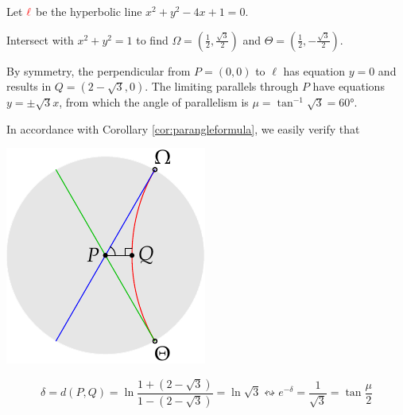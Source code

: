 \begin{examples}{}{}
\exstart Let $\textcolor{red}{\ell}$ be the hyperbolic line $x^2+y^2-4x+1=0$.\par
\begin{enumerate}\setcounter{enumi}{1}
\begin{minipage}[t]{0.7\linewidth}\vspace{-5pt}
  \item[]Intersect with $x^2+y^2=1$ to find $\Omega=\left(\tfrac 12,\tfrac{\sqrt 3}2\right)$ and $\Theta=\left(\tfrac 12,-\tfrac{\sqrt 3}2\right)$.\par
	By symmetry, the perpendicular from $P=(0,0)$ to $\ell$ has equation $y=0$ and results in $Q=(2-\sqrt 3,0)$. \smallbreak
	The limiting parallels through $P$ have equations $y=\pm\sqrt 3x$, from which the angle of parallelism is $\mu=\tan^{-1}\sqrt 3=\ang{60}$.\par
  In accordance with Corollary \ref{cor:parangleformula}, we easily verify that
\end{minipage}\begin{minipage}[t]{0.3\linewidth}\vspace{-25pt}
  \flushright\includegraphics{basic-parallels4}
\end{minipage}\par\vspace{-15pt}
	\[\delta=d(P,Q)=\ln\frac{1+(2-\sqrt 3)}{1-(2-\sqrt 3)}=\ln\sqrt 3 \leftrightsquigarrow e^{-\delta}=\frac 1{\sqrt 3}=\tan\frac{\mu}2\]
  

\end{enumerate}
\end{examples}
